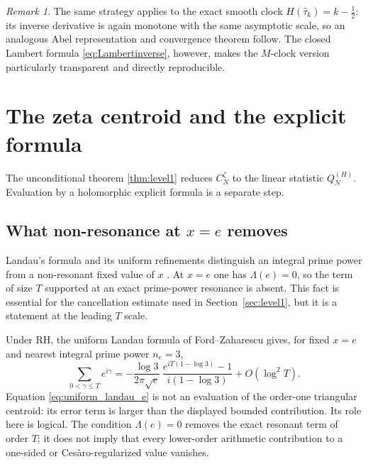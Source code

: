 \documentclass[11pt]{amsart}
\numberwithin{equation}{section}
\theoremstyle{definition}
\theoremstyle{remark}
\newtheorem{remark}[theorem]{Remark}
\begin{document}
\begin{remark}
The same strategy applies to the exact smooth clock $H(\widehat\tau_k)=k-\tfrac12$: its inverse derivative is again monotone with the same asymptotic scale, so an analogous Abel representation and convergence theorem follow.  The closed Lambert formula \eqref{eq:Lambertinverse}, however, makes the $M$-clock version particularly transparent and directly reproducible.
\end{remark}

\section{The zeta centroid and the explicit formula}\label{sec:explicit}

The unconditional theorem \ref{thm:level1} reduces $C_N^{\zeta}$ to the linear statistic $Q_N^{(H)}$.  Evaluation by a holomorphic explicit formula is a separate step.

\subsection{What non-resonance at $x=e$ removes}\label{subsec:nonresonance}
Landau's formula and its uniform refinements distinguish an integral prime power from a non-resonant fixed value of $x$ \cite{Landau1912,Gonek1993,FordZaharescu2005}.  At $x=e$ one has $\Lambda(e)=0$, so the term of size $T$ supported at an exact prime-power resonance is absent.  This fact is essential for the cancellation estimate used in Section~\ref{sec:level1}, but it is a statement at the leading $T$ scale.

Under RH, the uniform Landau formula of Ford--Zaharescu gives, for fixed $x=e$ and nearest integral prime power $n_e=3$,
\begin{equation}\label{eq:uniform_landau_e}
\sum_{0<\gamma\leq T}e^{i\gamma}
=-\frac{\log3}{2\pi\sqrt e}\,
\frac{e^{iT(1-\log3)}-1}{i(1-\log3)}
+O(\log^2 T).
\end{equation}
Equation \eqref{eq:uniform_landau_e} is not an evaluation of the order-one triangular centroid: its error term is larger than the displayed bounded contribution.  Its role here is logical.  The condition $\Lambda(e)=0$ removes the exact resonant term of order $T$; it does not imply that every lower-order arithmetic contribution to a one-sided or Cesàro-regularized value vanishes.
\end{document}
